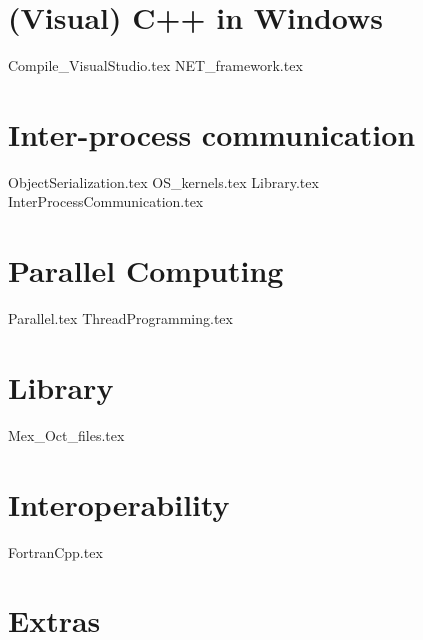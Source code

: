 \documentclass[11pt]{book}
\begin{document}



\part{(Visual) C++ in Windows}



{Compile_VisualStudio.tex}
{NET_framework.tex}





\part{Inter-process communication}
{ObjectSerialization.tex}
{OS_kernels.tex}
{Library.tex}
{InterProcessCommunication.tex}




\part{Parallel Computing}
{Parallel.tex}
{ThreadProgramming.tex}






 
\part{Library}



 



{Mex_Oct_files.tex}



\part{Interoperability}

{FortranCpp.tex}



\part{Extras}

 
\end{document}
